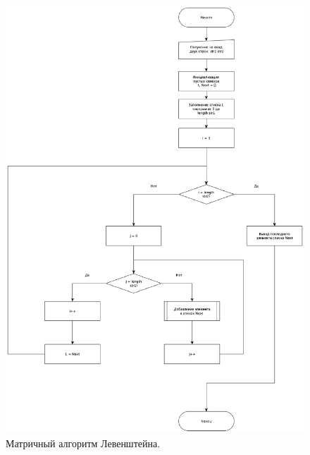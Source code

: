 \documentclass[12pt]{report}
\begin{document}
	\begin{figure}[h!]
		\centering
		\includegraphics[width=0.9\linewidth]{LevenM}
		\caption{Матричный алгоритм Левенштейна.}
		\label{ris:image4}
	\end{figure}

\newpage
	
\end{document}
